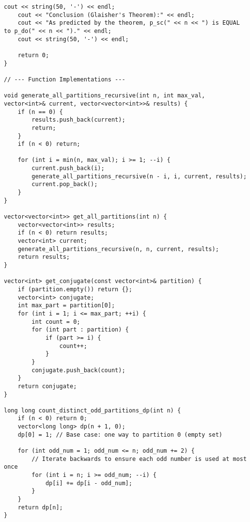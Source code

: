 \documentclass[a4paper,12pt]{article}
\begin{document}
\begin{lstlisting}[style=cppstyle, caption={Self-conjugate and Distinct-Odd Partitions in C++.}, label={lst:cpp_self_conj}]
    cout << string(50, '-') << endl;
    cout << "Conclusion (Glaisher's Theorem):" << endl;
    cout << "As predicted by the theorem, p_sc(" << n << ") is EQUAL to p_do(" << n << ")." << endl;
    cout << string(50, '-') << endl;

    return 0;
}

// --- Function Implementations ---

void generate_all_partitions_recursive(int n, int max_val, vector<int>& current, vector<vector<int>>& results) {
    if (n == 0) {
        results.push_back(current);
        return;
    }
    if (n < 0) return;

    for (int i = min(n, max_val); i >= 1; --i) {
        current.push_back(i);
        generate_all_partitions_recursive(n - i, i, current, results);
        current.pop_back();
    }
}

vector<vector<int>> get_all_partitions(int n) {
    vector<vector<int>> results;
    if (n < 0) return results;
    vector<int> current;
    generate_all_partitions_recursive(n, n, current, results);
    return results;
}

vector<int> get_conjugate(const vector<int>& partition) {
    if (partition.empty()) return {};
    vector<int> conjugate;
    int max_part = partition[0];
    for (int i = 1; i <= max_part; ++i) {
        int count = 0;
        for (int part : partition) {
            if (part >= i) {
                count++;
            }
        }
        conjugate.push_back(count);
    }
    return conjugate;
}

long long count_distinct_odd_partitions_dp(int n) {
    if (n < 0) return 0;
    vector<long long> dp(n + 1, 0);
    dp[0] = 1; // Base case: one way to partition 0 (empty set)

    for (int odd_num = 1; odd_num <= n; odd_num += 2) {
        // Iterate backwards to ensure each odd number is used at most once
        for (int i = n; i >= odd_num; --i) {
            dp[i] += dp[i - odd_num];
        }
    }
    return dp[n];
}
\end{lstlisting}
\end{document}
